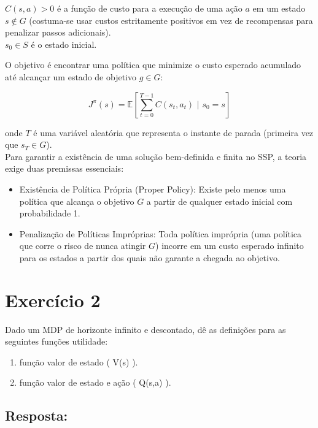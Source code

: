 \documentclass[a4paper,12pt]{article}
\begin{document}
$C(s, a) > 0$ é a função de custo para a execução de uma ação $a$ em um estado $s \notin G$ (costuma-se usar custos estritamente positivos em vez de recompensas para penalizar passos adicionais).\\

$s_0 \in S$ é o estado inicial.

O objetivo é encontrar uma política que minimize o custo esperado acumulado até alcançar um estado de objetivo $g \in G$:

$$J^{\pi}(s) = \mathbb{E} \left[ \sum_{t=0}^{T-1} C(s_t, a_t) \,\,\Big\vert{}\,\, s_0 = s \right]$$

onde $T$ é uma variável aleatória que representa o instante de parada (primeira vez que $s_T \in G$).\\

Para garantir a existência de uma solução bem-definida e finita no SSP, a teoria exige duas premissas essenciais:

\begin{itemize}
	\item Existência de Política Própria (Proper Policy): Existe pelo menos uma política que alcança o objetivo $G$ a partir de qualquer estado inicial com probabilidade 1.
	\item Penalização de Políticas Impróprias: Toda política imprópria (uma política que corre o risco de nunca atingir $G$) incorre em um custo esperado infinito para os estados a partir dos quais não garante a chegada ao objetivo.
\end{itemize}


\section*{Exercício 2}

Dado um MDP de horizonte infinito e descontado, dê as definições para as
seguintes funções utilidade:

\begin{enumerate}[label=\alph*)]
	\item função valor de estado ( V(s) ).
	\item função valor de estado e ação ( Q(s,a) ).
\end{enumerate}


\subsection*{Resposta:}

\bigskip
\end{document}
